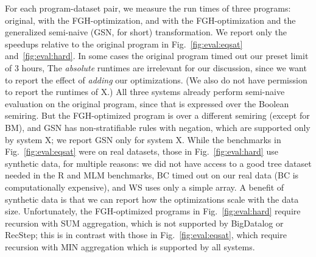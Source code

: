    For each program-dataset pair, we measure the run times of three
    programs: original, with the FGH-optimization, and with the
    FGH-optimization and the generalized semi-naive (GSN, for short)
    transformation.  We report only the speedups relative to the original
    program in Fig.~\ref{fig:eval:eqsat} and~\ref{fig:eval:hard}.  In some
    cases the original program timed out our preset limit of 3 hours, 
      The {\em absolute} runtimes are irrelevant
    for our discussion, since we want to report the effect of {\em adding}
    our optimizations.  (We also do not have permission to report the
    runtimes of X.)  All three systems already perform semi-naive
    evaluation on the original program, since that is expressed over the
    Boolean semiring.  But the FGH-optimized program is over a different
    semiring (except for BM), and GSN has non-stratifiable rules with
    negation, which are supported only by system X; we report GSN only for
    system X.  While the benchmarks in Fig.~\ref{fig:eval:eqsat} were on
    real datasets, those in Fig.~\ref{fig:eval:hard} use synthetic data,
    for multiple reasons: we did not have access to a good tree dataset
    needed in the R and MLM benchmarks, BC timed out on our real data (BC
    is computationally expensive), and WS uses only a simple array.  A
    benefit of synthetic data is that we can report how the optimizations
    scale with the data size.  Unfortunately, the FGH-optimized programs
    in Fig.~\ref{fig:eval:hard} require recursion with \textsf{SUM}
    aggregation, which is not supported by BigDatalog or RecStep; this is
    in contrast with those in Fig.~\ref{fig:eval:eqsat}, which require
    recursion with \textsf{MIN} aggregation which is supported by all
    systems.
    
    
